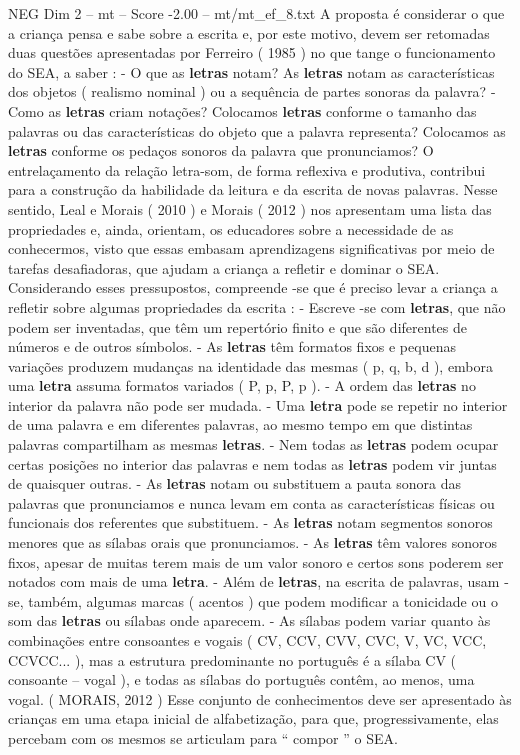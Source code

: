 \begin{textsample}{NEG Dim 2 – mt – Score -2.00 – mt/mt\_ef\_8.txt}
A proposta é considerar o que a criança pensa e sabe sobre a escrita e, por este motivo, devem ser retomadas duas questões apresentadas por Ferreiro ( 1985 ) no que tange o funcionamento do SEA, a saber : - O que as \textbf{letras} notam?
As \textbf{letras} notam as características dos objetos ( realismo nominal ) ou a sequência de partes sonoras da palavra? - Como as \textbf{letras} criam notações?
Colocamos \textbf{letras} conforme o tamanho das palavras ou das características do objeto que a palavra representa?
Colocamos as \textbf{letras} conforme os pedaços sonoros da palavra que pronunciamos?
O entrelaçamento da relação letra-som, de forma reflexiva e produtiva, contribui para a construção da habilidade da leitura e da escrita de novas palavras.
Nesse sentido, Leal e Morais ( 2010 ) e Morais ( 2012 ) nos apresentam uma lista das propriedades e, ainda, orientam, os educadores sobre a necessidade de as conhecermos, visto que essas embasam aprendizagens significativas por meio de tarefas desafiadoras, que ajudam a criança a refletir e dominar o SEA.
Considerando esses pressupostos, compreende -se que é preciso levar a criança a refletir sobre algumas propriedades da escrita : - Escreve -se com \textbf{letras}, que não podem ser inventadas, que têm um repertório finito e que são diferentes de números e de outros símbolos. - As \textbf{letras} têm formatos fixos e pequenas variações produzem mudanças na identidade das mesmas ( p, q, b, d ), embora uma \textbf{letra} assuma formatos variados ( P, p, P, p ). - A ordem das \textbf{letras} no interior da palavra não pode ser mudada. - Uma \textbf{letra} pode se repetir no interior de uma palavra e em diferentes palavras, ao mesmo tempo em que distintas palavras compartilham as mesmas \textbf{letras}. - Nem todas as \textbf{letras} podem ocupar certas posições no interior das palavras e nem todas as \textbf{letras} podem vir juntas de quaisquer outras. - As \textbf{letras} notam ou substituem a pauta sonora das palavras que pronunciamos e nunca levam em conta as características físicas ou funcionais dos referentes que substituem. - As \textbf{letras} notam segmentos sonoros menores que as sílabas orais que pronunciamos. - As \textbf{letras} têm valores sonoros fixos, apesar de muitas terem mais de um valor sonoro e certos sons poderem ser notados com mais de uma \textbf{letra}. - Além de \textbf{letras}, na escrita de palavras, usam -se, também, algumas marcas ( acentos ) que podem modificar a tonicidade ou o som das \textbf{letras} ou sílabas onde aparecem. - As sílabas podem variar quanto às combinações entre consoantes e vogais ( CV, CCV, CVV, CVC, V, VC, VCC, CCVCC... ), mas a estrutura predominante no português é a sílaba CV ( consoante – vogal ), e todas as sílabas do português contêm, ao menos, uma vogal. ( MORAIS, 2012 ) Esse conjunto de conhecimentos deve ser apresentado às crianças em uma etapa inicial de alfabetização, para que, progressivamente, elas percebam com os mesmos se articulam para “ compor ” o SEA.

\end{textsample}
